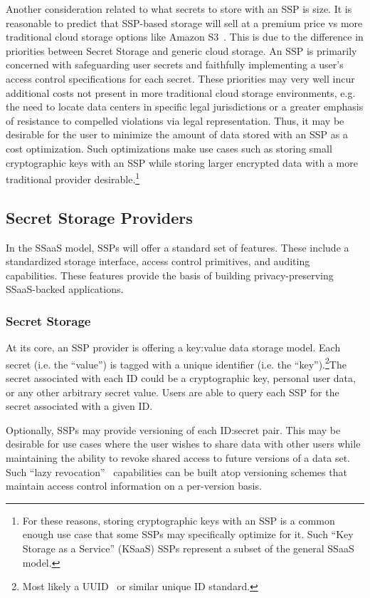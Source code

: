 Another consideration related to what secrets to store with an SSP is
size. It is reasonable to predict that SSP-based storage will sell at
a premium price vs more traditional cloud storage options like Amazon
S3~\cite{amazon-s3}. This is due to the difference in priorities
between Secret Storage and generic cloud storage. An SSP is primarily
concerned with safeguarding user secrets and faithfully implementing a
user's access control specifications for each secret. These priorities
may very well incur additional costs not present in more traditional
cloud storage environments, e.g. the need to locate data centers in
specific legal jurisdictions or a greater emphasis of resistance to
compelled violations via legal representation. Thus, it may be
desirable for the user to minimize the amount of data stored with an
SSP as a cost optimization. Such optimizations make use cases such as
storing small cryptographic keys with an SSP while storing larger
encrypted data with a more traditional provider
desirable.\footnote{For these reasons, storing cryptographic keys with
  an SSP is a common enough use case that some SSPs may specifically
  optimize for it. Such ``Key Storage as a Service'' (KSaaS) SSPs
  represent a subset of the general SSaaS model.}

\subsection{Secret Storage Providers}

In the SSaaS model, SSPs will offer a standard set of features. These
include a standardized storage interface, access control primitives,
and auditing capabilities. These features provide the basis of
building privacy-preserving SSaaS-backed applications.

\subsubsection{Secret Storage}

At its core, an SSP provider is offering a key:value data storage
model. Each secret (i.e. the ``value'') is tagged with a unique
identifier (i.e. the ``key'').\footnote{Most likely a
  UUID~\cite{leach2005} or similar unique ID standard.}The secret
associated with each ID could be a cryptographic key, personal user
data, or any other arbitrary secret value. Users are able to query
each SSP for the secret associated with a given ID.

Optionally, SSPs may provide versioning of each ID:secret pair. This
may be desirable for use cases where the user wishes to share data
with other users while maintaining the ability to revoke shared access
to future versions of a data set. Such ``lazy
revocation''~\cite{kallahalla2003} capabilities can be built atop
versioning schemes that maintain access control information on a
per-version basis.

